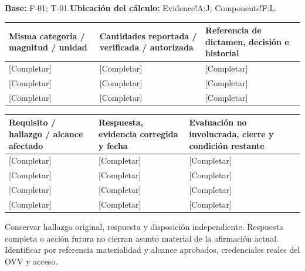 \textbf{Base:} F-01; T-01.\quad\textbf{Ubicación del cálculo:} Evidence!A:J; Components!F:L.\par\endgroup
{\sffamily\fontsize{8.6}{10.7}\selectfont\begin{longtable}{@{}P{48mm}P{61mm}P{53mm}@{}}
\toprule
\textbf{Misma categoría / magnitud / unidad} & \textbf{Cantidades reportada / verificada / autorizada} & \textbf{Referencia de dictamen, decisión e historial}\\\midrule\endhead
\rule{0pt}{8mm}[Completar] & [Completar] & [Completar]\\\hline
\rule{0pt}{8mm}[Completar] & [Completar] & [Completar]\\\hline
\rule{0pt}{8mm}[Completar] & [Completar] & [Completar]\\\hline
\end{longtable}}
{\sffamily\fontsize{8.6}{10.7}\selectfont\begin{longtable}{@{}P{48mm}P{61mm}P{53mm}@{}}
\toprule
\textbf{Requisito / hallazgo / alcance afectado} & \textbf{Respuesta, evidencia corregida y fecha} & \textbf{Evaluación no involucrada, cierre y condición restante}\\\midrule\endhead
\rule{0pt}{8mm}[Completar] & [Completar] & [Completar]\\\hline
\rule{0pt}{8mm}[Completar] & [Completar] & [Completar]\\\hline
\rule{0pt}{8mm}[Completar] & [Completar] & [Completar]\\\hline
\rule{0pt}{8mm}[Completar] & [Completar] & [Completar]\\\hline
\end{longtable}}
Conservar hallazgo original, respuesta y disposición independiente. Respuesta completa o acción futura no cierran asunto material de la afirmación actual. Identificar por referencia materialidad y alcance aprobados, credenciales reales del OVV y acceso.\par
{}

